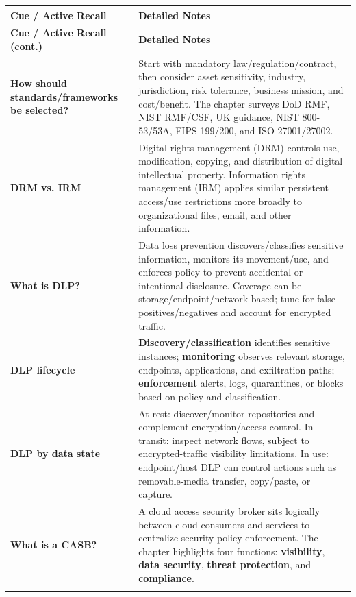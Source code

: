 \documentclass[10pt,letterpaper]{article}
\makeatletter
\newenvironment{cornell}
{\rowcolors{2}{white}{notebg}\begin{longtable}{@{}>{\raggedright\arraybackslash\columncolor{cuebg}\color{navy}\bfseries}p{0.285\textwidth}>{\raggedright\arraybackslash}p{0.65\textwidth}@{}}
\rowcolor{navy}\color{white}\textbf{Cue / Active Recall} & \color{white}\textbf{Detailed Notes}\\ \hline\endfirsthead
\rowcolor{navy}\color{white}\textbf{Cue / Active Recall (cont.)} & \color{white}\textbf{Detailed Notes}\\ \hline\endhead}{\end{longtable}}
\newcommand{\noterow}[2]{#1 & #2\\\arrayrulecolor{line}\hline}
\makeatother
\begin{document}
\begin{cornell}
\noterow{How should standards/frameworks be selected?}{Start with mandatory law/regulation/contract, then consider asset sensitivity, industry, jurisdiction, risk tolerance, business mission, and cost/benefit. The chapter surveys DoD RMF, NIST RMF/CSF, UK guidance, NIST 800-53/53A, FIPS 199/200, and ISO 27001/27002.}
\noterow{DRM vs. IRM}{Digital rights management (DRM) controls use, modification, copying, and distribution of digital intellectual property. Information rights management (IRM) applies similar persistent access/use restrictions more broadly to organizational files, email, and other information.}
\noterow{What is DLP?}{Data loss prevention discovers/classifies sensitive information, monitors its movement/use, and enforces policy to prevent accidental or intentional disclosure. Coverage can be storage/endpoint/network based; tune for false positives/negatives and account for encrypted traffic.}
\noterow{DLP lifecycle}{\textbf{Discovery/classification} identifies sensitive instances; \textbf{monitoring} observes relevant storage, endpoints, applications, and exfiltration paths; \textbf{enforcement} alerts, logs, quarantines, or blocks based on policy and classification.}
\noterow{DLP by data state}{At rest: discover/monitor repositories and complement encryption/access control. In transit: inspect network flows, subject to encrypted-traffic visibility limitations. In use: endpoint/host DLP can control actions such as removable-media transfer, copy/paste, or capture.}
\noterow{What is a CASB?}{A cloud access security broker sits logically between cloud consumers and services to centralize security policy enforcement. The chapter highlights four functions: \textbf{visibility}, \textbf{data security}, \textbf{threat protection}, and \textbf{compliance}.}
\end{cornell}
\end{document}
